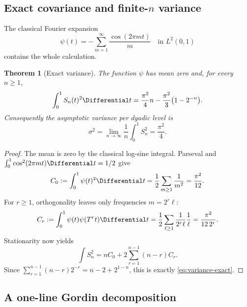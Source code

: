 \documentclass[11pt,oneside]{article}
\newtheorem{theorem}{Theorem}[section]
\theoremstyle{definition}
\theoremstyle{remark}
\begin{document}
\subsection{Exact covariance and finite-\texorpdfstring{$n$}{n} variance}

The classical Fourier expansion
\begin{equation}
 \psi(t)=-\sum_{m=1}^{\infty}\frac{\cos(2\pi mt)}{m}
 \quad\text{in }L^2(0,1)
 \label{eq:clausen}
\end{equation}
contains the whole calculation.

\begin{theorem}[Exact variance]
\label{thm:exact-variance}
The function $\psi$ has mean zero and, for every $n\ge1$,
\begin{equation}
 \int_0^1 S_n(t)^2\Differential t
 =\frac{\pi^2}{4}n-\frac{\pi^2}{3}\bigl(1-2^{-n}\bigr).
 \label{eq:variance-exact}
\end{equation}
Consequently the asymptotic variance per dyadic level is
\begin{equation}
 \sigma^2=\lim_{n\to\infty}\frac1n\int_0^1S_n^2=\frac{\pi^2}{4}.
 \label{eq:sigma}
\end{equation}
\end{theorem}

\begin{proof}
The mean is zero by the classical log-sine integral.  Parseval and
$\int_0^1\cos^2(2\pi mt)\Differential t=1/2$ give
\[
 C_0:=\int_0^1\psi(t)^2\Differential t
 =\frac12\sum_{m\ge1}\frac1{m^2}=\frac{\pi^2}{12}.
\]
For $r\ge1$, orthogonality leaves only frequencies $m=2^r\ell$:
\[
 C_r:=\int_0^1\psi(t)\psi(T^rt)\Differential t
 =\frac12\sum_{\ell\ge1}\frac1{2^r\ell}\frac1\ell
 =\frac{\pi^2}{12\,2^r}.
\]
Stationarity now yields
\[
 \int S_n^2=nC_0+2\sum_{r=1}^{n-1}(n-r)C_r.
\]
Since $\sum_{r=1}^{n-1}(n-r)2^{-r}=n-2+2^{1-n}$, this is exactly
\eqref{eq:variance-exact}.
\end{proof}

\subsection{A one-line Gordin decomposition}
\end{document}

